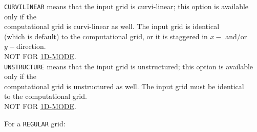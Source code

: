 \documentclass[12pt]{book}
\begin{document}
\begin{tabbing}
{\tt CURVILINEAR}   \> means that the input grid is curvi-linear; this option is available only if the\+\\
                       computational grid is curvi-linear as well. The input grid is identical\\
                       (which is default) to the computational grid, or it is staggered in $x-$ and/or\\
                       $y-$direction.\\
                       NOT FOR \underline{1D-MODE}.\-\\
{\tt UNSTRUCTURE}   \> means that the input grid is unstructured; this option is available only if the\+\\
                       computational grid is unstructured as well. The input grid must be identical\\
                       to the computational grid.\\
                       NOT FOR \underline{1D-MODE}.\-\\
\end{tabbing}
For a {\tt REGULAR} grid:
\end{document}

